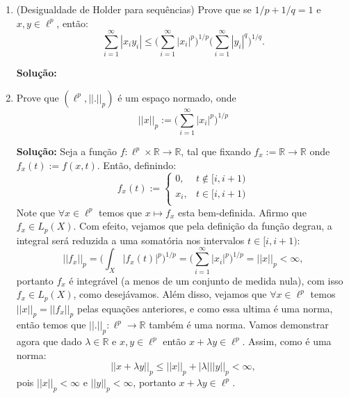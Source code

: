 \documentclass{article}
\begin{document}
\begin{enumerate}
\begin{enumerate}
				\item (Desigualdade de Holder para sequências) Prove que se $1/p + 1/q = 1$ e $x, y \in \ell^{p}$, então:
				$$
				\sum \limits_{i=1}^{\infty} |x_{i}y_{i}| \leq \Big(\sum \limits_{i=1}^{\infty} |x_{i}|^{p}\Big)^{1/p} \Big(\sum \limits_{i=1}^{\infty}|y_{i}|^{q}\Big)^{1/q}.
				$$
				
				\textbf{Solução:}
				
				\item Prove que $(\ell^{p}, ||.||_p)$ é um espaço normado, onde
				$$
				||x||_{p} := \Big(\sum \limits_{i=1}^{\infty} |x_{i}|^{p}\Big)^{1/p}
				$$
				
				\textbf{Solução:} Seja a função $f: \ell^{p} \times \mathbb{R} \to \mathbb{R}$, tal que fixando $f_{x} := \mathbb{R} \to \mathbb{R}$ onde $f_{x}(t) := f(x, t)$. Então, definindo:
				$$
				f_{x}(t) := \left\{
				\begin{array}{cc}
				0, & t \notin [i, i+1)\\
				x_{i}, & t \in [i, i+1) \\
				\end{array}
				\right.
				$$
				Note que $\forall x \in \ell^{p}$ temos que $x \mapsto f_{x}$ esta bem-definida. Afirmo que $f_{x} \in L_{p}(X)$. Com efeito, vejamos que pela definição da função degrau, a integral será reduzida a uma somatória nos intervalos $t \in [i, i+1)$: 
				$$
				||f_{x}||_{p} = \Big(\int_{X}|f_x(t)|^{p}\Big)^{1/p} = \Big(\sum \limits_{i=1}^{\infty}|x_i|^{p}\Big)^{1/p} = ||x||_{p} < \infty, 
				$$
				portanto $f_{x}$ é integrável (a menos de um conjunto de medida nula), com isso $f_{x} \in L_{p}(X)$, como desejávamos. Além disso, vejamos que $\forall x \in \ell^{p}$ temos $||x||_{p} = ||f_{x}||_{p}$ pelas equações anteriores, e como essa ultima é uma norma, então temos que $||.||_{p}: \ell^{p} \to \mathbb{R}$ também é uma norma. Vamos demonstrar agora que dado $\lambda \in \mathbb{R}$ e $x, y \in \ell^{p}$ então $x+\lambda y \in \ell^{p}$. Assim, como é uma norma:
				$$
				||x+\lambda y||_{p} \leq ||x||_{p} + |\lambda |||y||_{p} < \infty,
				$$
				pois $||x||_{p} < \infty$ e $||y||_{p} < \infty$, portanto $x+\lambda y \in \ell^{p}$.
				

\end{enumerate}
\end{enumerate}
\end{document}
